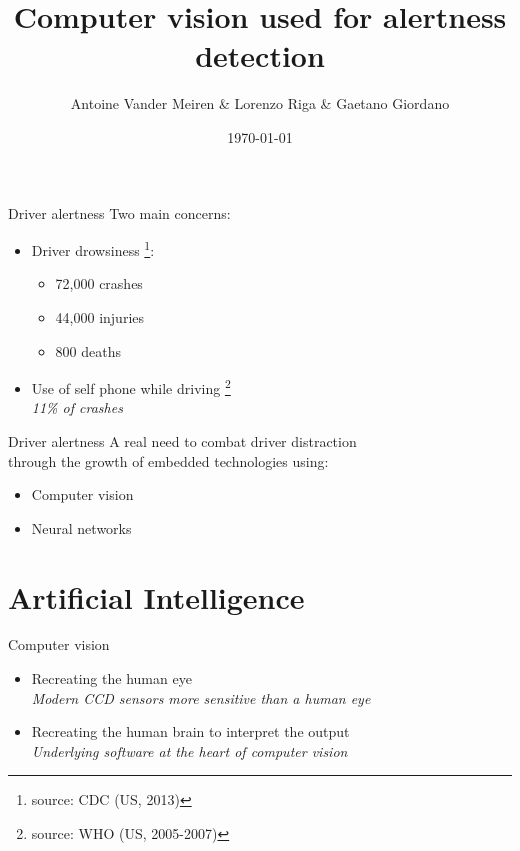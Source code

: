 \documentclass{beamer}
\title{Computer vision used for alertness detection}
\date{\today}
\author{Antoine Vander Meiren \& Lorenzo Riga \& Gaetano Giordano}
\institute{ECAM Brussels}
\begin{document}
\maketitle
\begin{frame}{Driver alertness}
Two main concerns:
	\begin{itemize}
        \item Driver drowsiness \footnote{source: CDC (US, 2013) }:
    \begin{itemize}
        \item 72,000 crashes
        \item 44,000 injuries
        \item 800 deaths
    \end{itemize}
    \item Use of self phone while driving \footnote{source: WHO (US, 2005-2007)} \\
        \hspace{0.27cm} \textit{11\% of crashes}
	\end{itemize}
\end{frame}

\begin{frame}{Driver alertness}
A real need to combat driver distraction \\
through the growth of embedded technologies using:
    \begin{itemize}
    \item Computer vision
    \item Neural networks
    \end{itemize}
\end{frame}

\section{Artificial Intelligence}
\begin{frame}{Computer vision}
	\begin{itemize}
	\item Recreating the human eye \\
        \hspace{0.27cm} \textit{Modern CCD sensors more sensitive than a human eye}
    \item Recreating the human brain to interpret the output \\
        \hspace{0.27cm} \textit{Underlying software at the heart of computer vision}
	\end{itemize}
\end{frame}
\end{document}
